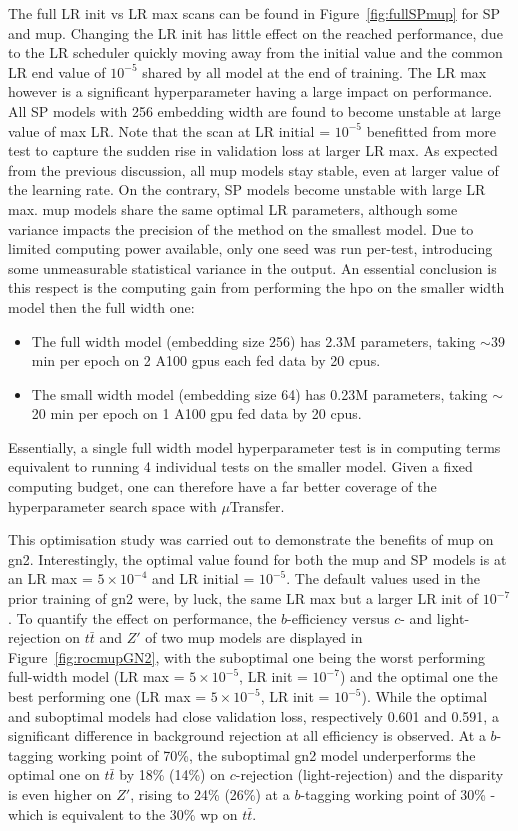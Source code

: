 The full LR init vs LR max scans can be found in Figure~\ref{fig:fullSPmup} for SP and \gls{mup}. Changing the LR init has little effect on the reached performance, due to the LR scheduler quickly moving away from the initial value and the common LR end value of $10^{-5}$ shared by all model at the end of training. The LR max however is a significant hyperparameter having a large impact on performance. All SP models with 256 embedding width are found to become unstable at large value of max LR. Note that the scan at LR initial = $10^{-5}$ benefitted from more test to capture the sudden rise in validation loss at larger LR max. As expected from the previous discussion, all \gls{mup} models stay stable, even at larger value of the learning rate. On the contrary, SP models become unstable with large LR max. \gls{mup} models share the same optimal LR parameters, although some variance impacts the precision of the method on the smallest model. Due to limited computing power available, only one seed was run per-test, introducing some unmeasurable statistical variance in the output. An essential conclusion is this respect is the computing gain from performing the \gls{hpo} on the smaller width model then the full width one:
\begin{itemize}
  \item The full width model (embedding size 256) has 2.3M parameters, taking $\sim$39 min per epoch on 2 A100 \gls{gpu}s each fed data by 20 \gls{cpu}s.
  \item The small width model (embedding size 64) has 0.23M parameters, taking $\sim$20 min per epoch on 1 A100 \gls{gpu} fed data by 20 \gls{cpu}s.
\end{itemize}
Essentially, a single full width model hyperparameter test is in computing terms equivalent to running 4 individual tests on the smaller model. Given a fixed computing budget, one can therefore have a far better coverage of the hyperparameter search space with $\mu$Transfer.

This optimisation study was carried out to demonstrate the benefits of \gls{mup} on \gls{gn2}. Interestingly, the optimal value found for both the \gls{mup} and SP models is at an LR max = $5 \times 10^{-4}$ and LR initial = $10^{-5}$. The default values used in the prior training of \gls{gn2} were, by luck, the same LR max but a larger LR init of $10^{-7}$. To quantify the effect on performance, the $b$-efficiency versus $c$- and light-rejection on $t\bar{t}$ and $Z'$ of two \gls{mup} models are displayed in Figure~\ref{fig:rocmupGN2}, with the suboptimal one being the worst performing full-width model (LR max = $5 \times 10^{-5}$, LR init = $10^{-7}$) and the optimal one the best performing one (LR max = $5\times 10^{-5}$, LR init = $10^{-5}$). While the optimal and suboptimal models had close validation loss, respectively 0.601 and 0.591, a significant difference in background rejection at all efficiency is observed. At a $b$-tagging working point of 70\%, the suboptimal \gls{gn2} model underperforms the optimal one on $t\bar{t}$ by 18\% (14\%) on $c$-rejection (light-rejection) and the disparity is even higher on $Z'$, rising to 24\% (26\%) at a $b$-tagging working point of 30\% - which is equivalent to the 30\% \gls{wp} on $t\bar{t}$.

